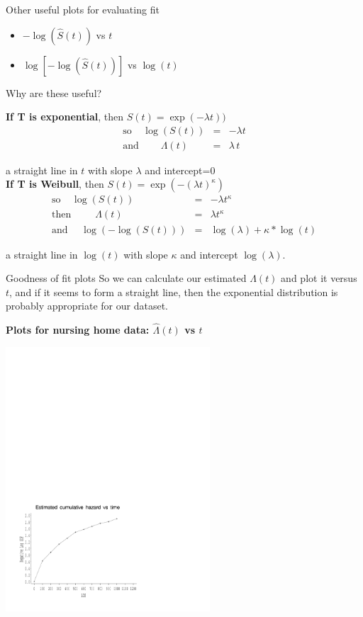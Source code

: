 \documentclass[envcountsect, 10pt, portrait, palatino]{beamer}
\begin{document}
\begin{frame}{Other useful plots for evaluating fit }
\begin{itemize}
\item  $-\log(\hat{S}(t))$ vs $t$

\vspace{0.2in}
\item  $\log[-\log(\hat{S}(t))]$ vs $\log(t)$
\end{itemize}

\vspace{0.2in}
Why are these useful?

{\bf If T is exponential}, then $S(t) = \exp(-\lambda t))$
\begin{eqnarray*}
\mbox{so}~~~~~ \log(S(t)) & = & -\lambda t\\
\mbox{and}~~~~~~~~~~ \Lambda(t) & = & \lambda \, t
\end{eqnarray*}

a straight line in $t$ with slope $\lambda$ and intercept=0\\[1ex]

\vspace{0.2in}
{\bf If T is Weibull}, then $S(t) = \exp(-(\lambda t)^\kappa)$
\begin{eqnarray*}
\mbox{so}~~~~~   \log(S(t)) & = & -\lambda t^\kappa\\
\mbox{then}~~~~~~~~~~~ \Lambda(t) & = &  \lambda t^\kappa\\
\mbox{and}~~~~~~  \log(-\log(S(t))) & = & \log(\lambda) + \kappa*\log(t)
\end{eqnarray*}

a straight line in $\log(t)$ with slope $\kappa$ and intercept $\log(\lambda)$.
\end{frame} 
\begin{frame}{Goodness of fit plots}
So we can calculate our estimated $\Lambda(t)$ and plot it versus $t$,
and if it seems to form a straight line, then the exponential
distribution is probably appropriate for our dataset.

{\bf Plots for nursing home data: $\hat\Lambda(t)$ vs $t$}
\centerline{\includegraphics[width=3in]{nh_ls.pdf}}
\end{frame} 
\end{document}
